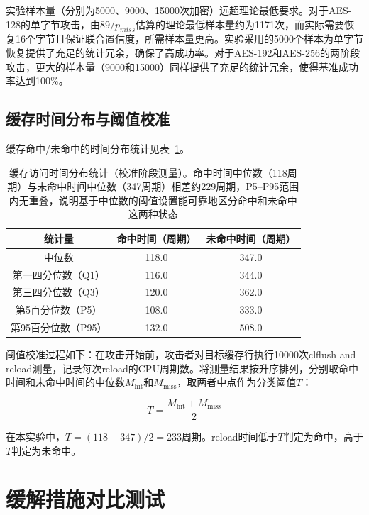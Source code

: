 实验样本量（分别为5000、9000、15000次加密）远超理论最低要求。对于AES-128的单字节攻击，由$89/p_{miss}$估算的理论最低样本量约为1171次，而实际需要恢复16个字节且保证联合置信度，所需样本量更高。实验采用的5000个样本为单字节恢复提供了充足的统计冗余，确保了高成功率。对于AES-192和AES-256的两阶段攻击，更大的样本量（9000和15000）同样提供了充足的统计冗余，使得基准成功率达到100\%。

\subsection{缓存时间分布与阈值校准}

缓存命中/未命中的时间分布统计见表~\ref{tab:cache_timing}。

\begin{table}[htbp]
    \centering
    \caption{缓存访问时间分布统计（校准阶段测量）。命中时间中位数（118周期）与未命中时间中位数（347周期）相差约229周期，P5--P95范围内无重叠，说明基于中位数的阈值设置能可靠地区分命中和未命中这两种状态}
    \label{tab:cache_timing}
    \begin{tabular}{ccc}
        \toprule
        统计量 & 命中时间（周期） & 未命中时间（周期） \\
        \midrule
        中位数 & 118.0 & 347.0 \\
        第一四分位数（Q1） & 116.0 & 344.0 \\
        第三四分位数（Q3） & 120.0 & 362.0 \\
        第5百分位数（P5） & 108.0 & 333.0 \\
        第95百分位数（P95） & 132.0 & 508.0 \\
        \bottomrule
    \end{tabular}
\end{table}

阈值校准过程如下：在攻击开始前，攻击者对目标缓存行执行10000次clflush and reload测量，记录每次reload的CPU周期数。将测量结果按升序排列，分别取命中时间和未命中时间的中位数$M_{\text{hit}}$和$M_{\text{miss}}$，取两者中点作为分类阈值$T$：

\begin{equation}
T = \frac{M_{\text{hit}} + M_{\text{miss}}}{2}
\end{equation}

在本实验中，$T = (118 + 347) / 2 = 233$周期。reload时间低于$T$判定为命中，高于$T$判定为未命中。

\section{缓解措施对比测试}

